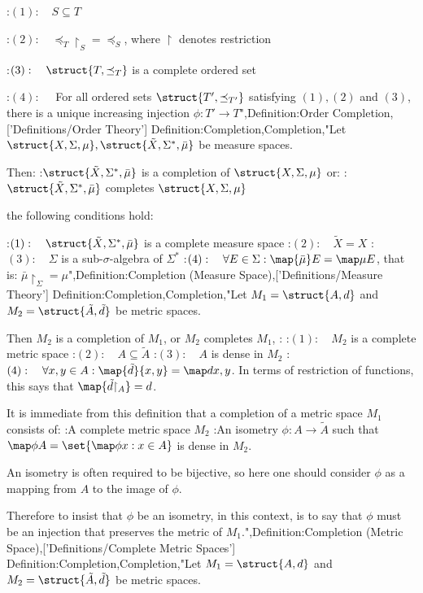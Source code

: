 :$(1):\quad S \subseteq T$

:$(2):\quad {\preceq_T \restriction_S} = {\preceq_S}$, where $\restriction$ denotes restriction

:$(3):\quad \struct {T, \preceq_T}$ is a complete ordered set

:$(4):\quad$ For all ordered sets $\struct {T', \preceq_{T'} }$ satisfying $(1), (2)$ and $(3)$, there is a unique increasing injection $\phi: T' \to T$",Definition:Order Completion,['Definitions/Order Theory']
Definition:Completion,Completion,"Let $\struct {X, \Sigma, \mu}, \struct {\tilde X, \Sigma^*, \bar \mu}$ be measure spaces.

Then:
:$\struct {\tilde X, \Sigma^*, \bar \mu}$ is a completion of $\struct {X, \Sigma, \mu}$
or:
:$\struct {\tilde X, \Sigma^*, \bar \mu}$ completes $\struct {X, \Sigma, \mu}$

 the following conditions hold:

:$(1): \quad \struct {\tilde X, \Sigma^*, \bar \mu}$ is a complete measure space
:$(2): \quad \tilde X = X$
:$(3): \quad \Sigma$ is a sub-$\sigma$-algebra of $\Sigma^*$
:$(4): \quad \forall E \in \Sigma: \map {\bar \mu} E = \map \mu E$, that is: $\bar \mu \restriction_\Sigma = \mu$",Definition:Completion (Measure Space),['Definitions/Measure Theory']
Definition:Completion,Completion,"Let $M_1 = \struct {A, d}$ and $M_2 = \struct {\tilde A, \tilde d}$ be metric spaces.

Then $M_2$ is a completion of $M_1$, or $M_2$ completes $M_1$, :
:$(1): \quad M_2$ is a complete metric space
:$(2): \quad A \subseteq \tilde A$
:$(3): \quad A$ is dense in $M_2$
:$(4): \quad \forall x, y \in A : \map {\tilde d} {x, y} = \map d {x, y}$. In terms of restriction of functions, this says that $\map {\tilde d {\restriction_A} } = d$.


It is immediate from this definition that a completion of a metric space $M_1$ consists of:
:A complete metric space $M_2$
:An isometry $\phi : A \to \tilde A$
such that $\map \phi A = \set {\map \phi x: x \in A}$ is dense in $M_2$.

An isometry is often required to be bijective, so here one should consider $\phi$ as a mapping from $A$ to the image of $\phi$.

Therefore to insist that $\phi$ be an isometry, in this context, is to say that $\phi$ must be an injection that preserves the metric of $M_1$.",Definition:Completion (Metric Space),['Definitions/Complete Metric Spaces']
Definition:Completion,Completion,"Let $M_1 = \struct {A, d}$ and $M_2 = \struct {\tilde A, \tilde d}$ be metric spaces.

